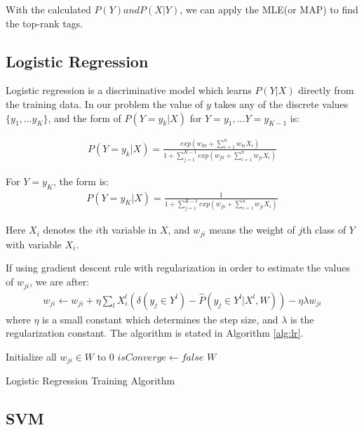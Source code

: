 With the calculated $P(Y) and P(X|Y)$, we can apply the MLE(or MAP) to find the top-rank tags.

\subsection{Logistic Regression}

Logistic regression is a discriminative model which learns $P(Y|X)$ directly from the training data. In our problem the value of $y$ takes any of the discrete values $\{y_1,...y_K\}$, and the form of $P(Y=y_k|X)$ for $Y=y_1,...Y=y_{K-1}$ is: 

\begin{gather}
	P(Y=y_k|X)=\frac{exp(w_{k0}+\sum_{i=1}^n{w_{ki}X_i})}{1+\sum_{j=1}^{K-1}exp(w_{j0}+\sum_{i=1}^n{w_{ji}X_i})}
\end{gather}

For $Y=y_K$, the form is:
\begin{gather}
	P(Y=y_K|X)=\frac{1}{1+\sum_{j=1}^{K-1}exp(w_{j0}+\sum_{i=1}^n{w_{ji}X_i})}
\end{gather}

Here $X_i$ denotes the $i$th variable in $X$, and $w_{ji}$ means the weight of $j$th class of $Y$ with variable $X_i$.

If using gradient descent rule with regularization in order to estimate the values of $w_{ji}$, we are after:
\begin{gather}
	w_{ji} \leftarrow w_{ji}+ \eta \sum_{l}X_{i}^{l}(\delta (y_{j} \in Y^{l})-\hat{P}(y_{j} \in Y^{l}|X^{l},W))- \eta \lambda w_{ji}
\end{gather}
where $\eta$ is a small constant which determines the step size, and $\lambda$ is the regularization constant. The algorithm is stated in Algorithm \ref{alg:lr}.

\IncMargin{1em}
\begin{algorithm}
\label{alg:lr}
\BlankLine
Initialize all $w_{ji} \in W$ to 0\;
$isConverge \leftarrow false$\;
\Return $W$\;
\caption{Logistic Regression Training Algorithm}\label{algo_disjdecomp}
\end{algorithm}
\DecMargin{1em}


\subsection{SVM}

